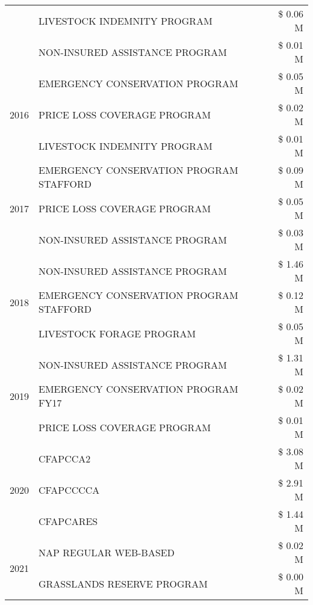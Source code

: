 \begin{tabular}{llr}
 & LIVESTOCK INDEMNITY PROGRAM & \$ 0.06 M \\
 & NON-INSURED ASSISTANCE PROGRAM & \$ 0.01 M \\
\cline{1-3}
\multirow[t]{3}{*}{2016} & EMERGENCY CONSERVATION PROGRAM                & \$ 0.05 M \\
 & PRICE LOSS COVERAGE PROGRAM                   & \$ 0.02 M \\
 & LIVESTOCK INDEMNITY PROGRAM                   & \$ 0.01 M \\
\cline{1-3}
\multirow[t]{3}{*}{2017} & EMERGENCY CONSERVATION PROGRAM STAFFORD & \$ 0.09 M \\
 & PRICE LOSS COVERAGE PROGRAM & \$ 0.05 M \\
 & NON-INSURED ASSISTANCE PROGRAM & \$ 0.03 M \\
\cline{1-3}
\multirow[t]{3}{*}{2018} & NON-INSURED ASSISTANCE PROGRAM & \$ 1.46 M \\
 & EMERGENCY CONSERVATION PROGRAM STAFFORD & \$ 0.12 M \\
 & LIVESTOCK FORAGE PROGRAM & \$ 0.05 M \\
\cline{1-3}
\multirow[t]{3}{*}{2019} & NON-INSURED ASSISTANCE PROGRAM & \$ 1.31 M \\
 & EMERGENCY CONSERVATION PROGRAM FY17 & \$ 0.02 M \\
 & PRICE LOSS COVERAGE PROGRAM & \$ 0.01 M \\
\cline{1-3}
\multirow[t]{3}{*}{2020} & CFAPCCA2 & \$ 3.08 M \\
 & CFAPCCCCA & \$ 2.91 M \\
 & CFAPCARES & \$ 1.44 M \\
\cline{1-3}
\multirow[t]{2}{*}{2021} & NAP REGULAR WEB-BASED & \$ 0.02 M \\
 & GRASSLANDS RESERVE PROGRAM & \$ 0.00 M \\
\cline{1-3}
\bottomrule
\end{tabular}
